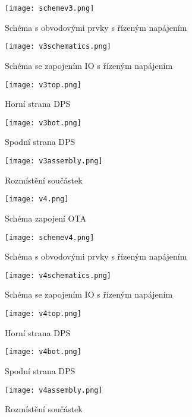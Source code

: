 \begin{figure}[h]
\centering
\texttt{[image: schemev3.png]}
\caption{Schéma s obvodovými prvky s řízeným napájením}
\end{figure}
\begin{figure}[h]
\centering
\texttt{[image: v3schematics.png]}
\caption{Schéma se zapojením IO s řízeným napájením}
\end{figure}
\begin{figure}[h]
\centering
\texttt{[image: v3top.png]}
\caption{Horní strana DPS}
\end{figure}
\begin{figure}[h]
\centering
\texttt{[image: v3bot.png]}
\caption{Spodní strana DPS}
\end{figure}
\begin{figure}[h]
\centering
\texttt{[image: v3assembly.png]}
\caption{Rozmístění součástek}
\end{figure}
\begin{figure}[h]
\centering
\texttt{[image: v4.png]}
\caption{Schéma zapojení OTA}
\end{figure}
\begin{figure}[h]
\centering
\texttt{[image: schemev4.png]}
\caption{Schéma s obvodovými prvky s řízeným napájením}
\end{figure}
\begin{figure}[h]
\centering
\texttt{[image: v4schematics.png]}
\caption{Schéma se zapojením IO s řízeným napájením}
\end{figure}
\begin{figure}[h]
\centering
\texttt{[image: v4top.png]}
\caption{Horní strana DPS}
\end{figure}
\begin{figure}[h]
\centering
\texttt{[image: v4bot.png]}
\caption{Spodní strana DPS}
\end{figure}
\begin{figure}[h]
\centering
\texttt{[image: v4assembly.png]}
\caption{Rozmístění součástek}
\end{figure}